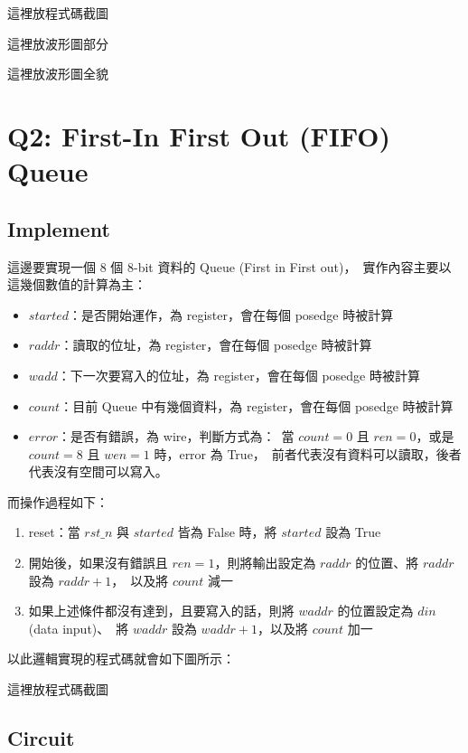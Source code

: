 \documentclass[10.5pt,compsoc,UTF8]{CjC}
\theoremstyle{mystyle}
\begin{document}
這裡放程式碼截圖

這裡放波形圖部分

這裡放波形圖全貌

\section{Q2: First-In First Out (FIFO) Queue}
\label{sec:Q2}

\subsection{Implement}

這邊要實現一個 8 個 8-bit 資料的 Queue (First in First out)，\
實作內容主要以這幾個數值的計算為主：
\begin{itemize}
  \item $started$：是否開始運作，為 register，會在每個 posedge 時被計算
  \item $raddr$：讀取的位址，為 register，會在每個 posedge 時被計算
  \item $wadd$：下一次要寫入的位址，為 register，會在每個 posedge 時被計算
  \item $count$：目前 Queue 中有幾個資料，為 register，會在每個 posedge 時被計算
  \item $error$：是否有錯誤，為 wire，判斷方式為：\
  當 $count = 0$ 且 $ren = 0$，或是 $count = 8$ 且 $wen = 1$ 時，error 為 True，\
  前者代表沒有資料可以讀取，後者代表沒有空間可以寫入。
\end{itemize}

而操作過程如下：
\begin{enumerate}
  \item reset：當 $rst\_n$ 與 $started$ 皆為 False 時，將 $started$ 設為 True
  \item 開始後，如果沒有錯誤且 $ren = 1$，則將輸出設定為 $raddr$ 的位置、將 $raddr$ 設為 $raddr + 1$，\
  以及將 $count$ 減一
  \item 如果上述條件都沒有達到，且要寫入的話，則將 $waddr$ 的位置設定為 $din$ (data input)、\
  將 $waddr$ 設為 $waddr + 1$，以及將 $count$ 加一
\end{enumerate}

以此邏輯實現的程式碼就會如下圖所示：

這裡放程式碼截圖

\subsection{Circuit}
\end{document}
